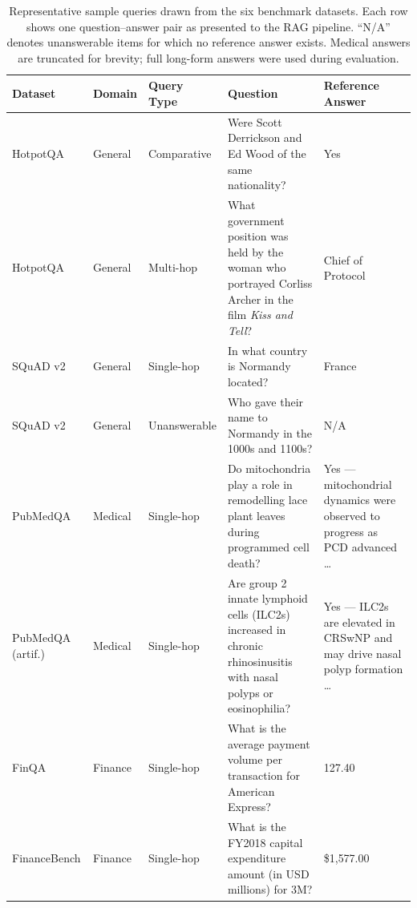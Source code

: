 \begin{table}[h]
\centering
\caption{Representative sample queries drawn from the six benchmark datasets.
Each row shows one question--answer pair as presented to the RAG pipeline.
``N/A'' denotes unanswerable items for which no reference answer exists.
Medical answers are truncated for brevity; full long-form answers were used
during evaluation.}
\label{tab:sample_queries}
\small
\begin{tabular}{p{2.2cm} l p{1.8cm} p{5.5cm} p{2.8cm}}
\toprule
\textbf{Dataset} & \textbf{Domain} & \textbf{Query Type} & \textbf{Question} & \textbf{Reference Answer} \\
\midrule

HotpotQA
  & General
  & Comparative
  & Were Scott Derrickson and Ed Wood of the same nationality?
  & Yes \\[4pt]

HotpotQA
  & General
  & Multi-hop
  & What government position was held by the woman who portrayed Corliss Archer in the film \textit{Kiss and Tell}?
  & Chief of Protocol \\[4pt]

SQuAD v2
  & General
  & Single-hop
  & In what country is Normandy located?
  & France \\[4pt]

SQuAD v2
  & General
  & Unanswerable
  & Who gave their name to Normandy in the 1000s and 1100s?
  & N/A \\[4pt]

PubMedQA
  & Medical
  & Single-hop
  & Do mitochondria play a role in remodelling lace plant leaves during programmed cell death?
  & Yes --- mitochondrial dynamics were observed to progress as PCD advanced \ldots \\[4pt]

PubMedQA (artif.)
  & Medical
  & Single-hop
  & Are group 2 innate lymphoid cells (ILC2s) increased in chronic rhinosinusitis with nasal polyps or eosinophilia?
  & Yes --- ILC2s are elevated in CRSwNP and may drive nasal polyp formation \ldots \\[4pt]

FinQA
  & Finance
  & Single-hop
  & What is the average payment volume per transaction for American Express?
  & 127.40 \\[4pt]

FinanceBench
  & Finance
  & Single-hop
  & What is the FY2018 capital expenditure amount (in USD millions) for 3M?
  & \$1{,}577.00 \\

\bottomrule
\end{tabular}
\end{table}
